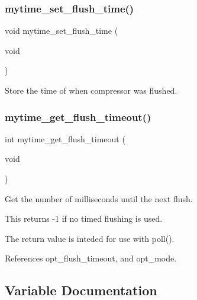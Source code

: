 \mbox{\label{mytime_8h_ade93cf3cf43b05f8cb67474ad7d7589f}} 
\subsubsection{mytime\+\_\+set\+\_\+flush\+\_\+time()}
{\footnotesize\ttfamily void mytime\+\_\+set\+\_\+flush\+\_\+time (\begin{DoxyParamCaption}\item[{void}]{ }\end{DoxyParamCaption})}



Store the time of when compressor was flushed. 

\mbox{\label{mytime_8h_ab0193efe1ad07b8eef17bbf712fbe788}} 
\subsubsection{mytime\+\_\+get\+\_\+flush\+\_\+timeout()}
{\footnotesize\ttfamily int mytime\+\_\+get\+\_\+flush\+\_\+timeout (\begin{DoxyParamCaption}\item[{void}]{ }\end{DoxyParamCaption})}



Get the number of milliseconds until the next flush. 

This returns -\/1 if no timed flushing is used.

The return value is inteded for use with poll(). 

References opt\+\_\+flush\+\_\+timeout, and opt\+\_\+mode.



\subsection{Variable Documentation}
\mbox{\label{mytime_8h_a8c313eb268d319b6a5e538628049333a}} 

